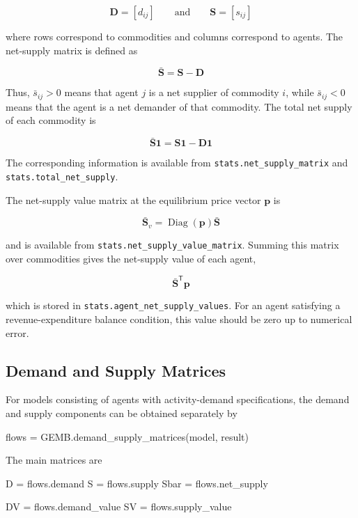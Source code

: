\documentclass[
  letterpaper,
  DIV=11,
  numbers=noendperiod]{scrreprt}
\newenvironment{Shaded}{\begin{snugshade}}{\end{snugshade}}
\newcommand{\FunctionTok}[1]{\textcolor[rgb]{0.28,0.35,0.67}{#1}}
\newcommand{\NormalTok}[1]{\textcolor[rgb]{0.00,0.23,0.31}{#1}}
\newcommand{\OperatorTok}[1]{\textcolor[rgb]{0.37,0.37,0.37}{#1}}
\begin{document}
\[
\mathbf D=[d_{ij}]
\qquad\text{and}\qquad
\mathbf S=[s_{ij}]
\]

where rows correspond to commodities and columns correspond to agents.
The net-supply matrix is defined as

\[
\bar{\mathbf S}
=
\mathbf S-\mathbf D
\]

Thus, \(\bar s_{ij}>0\) means that agent \(j\) is a net supplier of
commodity \(i\), while \(\bar s_{ij}<0\) means that the agent is a net
demander of that commodity. The total net supply of each commodity is

\[
\bar{\mathbf S}\mathbf 1
=
\mathbf S\mathbf 1-\mathbf D\mathbf 1
\]

The corresponding information is available from
\texttt{stats.net\_supply\_matrix} and
\texttt{stats.total\_net\_supply}.

The net-supply value matrix at the equilibrium price vector
\(\mathbf p\) is

\[
\bar{\mathbf S}_v
=
\operatorname{Diag}(\mathbf p)\bar{\mathbf S}
\]

and is available from \texttt{stats.net\_supply\_value\_matrix}. Summing
this matrix over commodities gives the net-supply value of each agent,

\[
\bar{\mathbf S}^{\mathsf T}\mathbf p
\]

which is stored in \texttt{stats.agent\_net\_supply\_values}. For an
agent satisfying a revenue-expenditure balance condition, this value
should be zero up to numerical error.

\subsection{Demand and Supply
Matrices}\label{demand-and-supply-matrices}

For models consisting of agents with activity-demand specifications, the
demand and supply components can be obtained separately by

\begin{Shaded}
\begin{Highlighting}[]
\NormalTok{flows }\OperatorTok{=}\NormalTok{ GEMB.}\FunctionTok{demand\_supply\_matrices}\NormalTok{(model, result)}
\end{Highlighting}
\end{Shaded}

The main matrices are

\begin{Shaded}
\begin{Highlighting}[]
\NormalTok{D }\OperatorTok{=}\NormalTok{ flows.demand}
\NormalTok{S }\OperatorTok{=}\NormalTok{ flows.supply}
\NormalTok{Sbar }\OperatorTok{=}\NormalTok{ flows.net\_supply}

\NormalTok{DV }\OperatorTok{=}\NormalTok{ flows.demand\_value}
\NormalTok{SV }\OperatorTok{=}\NormalTok{ flows.supply\_value}
\end{Highlighting}
\end{Shaded}
\end{document}
